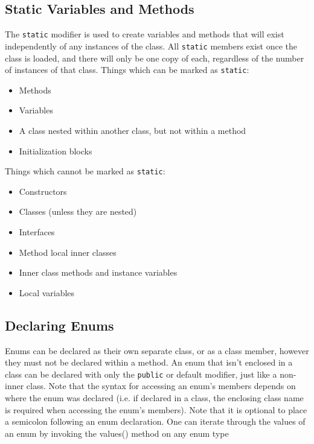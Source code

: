 \subsection{Static Variables and Methods}
The \verb#static# modifier is used to create variables and methods that will 
exist independently of any instances of the class. All \verb#static# members 
exist once the class is loaded, and there will only be one copy of each, 
regardless of the number of instances of that class. Things which can be marked 
as \verb#static#:
\begin{itemize}
    \item Methods
    \item Variables
    \item A class nested within another class, but not within a method
    \item Initialization blocks
\end{itemize}
Things which cannot be marked as \verb#static#:
\begin{itemize}
    \item Constructors
    \item Classes (unless they are nested)
    \item Interfaces
    \item Method local inner classes
    \item Inner class methods and instance variables
    \item Local variables
\end{itemize}

\subsection{Declaring Enums}
Enums can be declared as their own separate class, or as a class member, 
however they must not be declared within a method. An enum that isn't enclosed 
in a class can be declared with only the \verb#public# or default modifier, 
just like a non-inner class. Note that the syntax for accessing an enum's 
members depends on where the enum was declared (i.e. if declared in a class, 
the enclosing class name is required when accessing the enum's members). Note 
that it is optional to place a semicolon following an enum declaration. One can 
iterate through the values of an enum by invoking the values() method on any 
enum type

